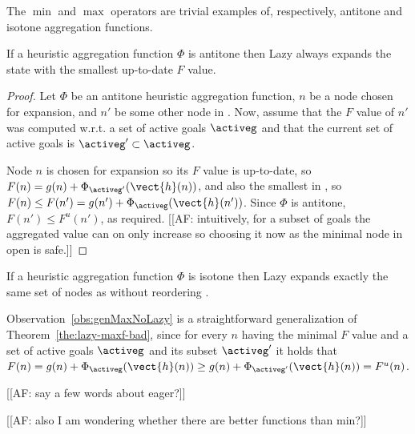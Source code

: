 The $\min$ and $\max$ operators are trivial examples of, respectively, antitone and isotone aggregation functions.
\begin{theorem}
  If a heuristic aggregation function $\Phi$ is antitone then Lazy \kastarphi always expands the state with the smallest up-to-date $F$ value.
\end{theorem}
\begin{proof}
Let $\Phi$ be an antitone heuristic aggregation function, $n$ be a node chosen for expansion, and $n'$ be some other node in \open.
Now, assume that the $F$ value of $n'$ was computed w.r.t. a set of active goals $\activeg$ and that the current set of active goals is $\activeg'\subset \activeg$.

Node $n$ is chosen for expansion so its $F$ value is up-to-date, so $F(n)=g(n)+\Phi_{\activeg'}(\vect{h}(n))$, and also the smallest in \open, so $F(n)\leq F(n')=g(n')+\Phi_{\activeg}(\vect{h}(n'))$.
Since $\Phi$ is antitone, $F(n')\leq F^u(n')$, as required.  [[AF: intuitively, for a subset of goals the aggregated value can on only increase so choosing it now as the minimal node in open is safe.]]
\end{proof}

\begin{observation}
  \label{obs:genMaxNoLazy}
  If a heuristic aggregation function $\Phi$ is isotone then Lazy \kastarphi expands exactly the same set of nodes as \kastarphi without reordering \open.
\end{observation}
Observation~\ref{obs:genMaxNoLazy} is a straightforward generalization of Theorem~\ref{the:lazy-maxf-bad},
since for every $n$ having the minimal $F$ value and a set of active goals $\activeg$ and its subset $\activeg'$ it holds that $F(n)=g(n)+\Phi_{\activeg}(\vect{h}(n))\geq g(n)+\Phi_{\activeg'}(\vect{h}(n))=F^u(n)$. 

[[AF: say a few words about eager?]]

[[AF: also I am wondering whether there are better functions than min?]]
